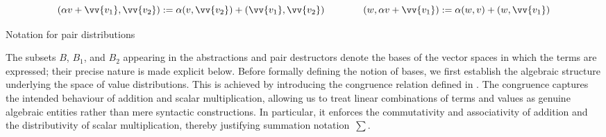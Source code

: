 \documentclass[runningheads,orivec,envcountsame,envcountsect]{llncs}
\def\Pair#1#2{(#1,#2)} %
\begin{document}
\begin{table}[t]
  \[
    \Pair{\alpha  v+\vv{v_1}}{\vv{v_2}} 
    := \alpha\Pair{v}{\vv{v_2}} + \Pair{\vv{v_1}}{\vv{v_2}}
    \qquad\qquad
    \Pair{w}{\alpha  v+\vv{v_1}} 
    := \alpha\Pair{w}{v} + \Pair{w}{\vv{v_1}}
  \]
  \caption{Notation for pair distributions}
  \label{tab:PairsNotation}
\end{table}

The subsets $B$, $B_1$, and $B_2$ appearing in the abstractions and pair
destructors denote the bases of the vector spaces in which the terms are
expressed; their precise nature is made explicit below.
Before formally defining the notion of bases, we first establish the
algebraic structure underlying the space of value distributions.
This is achieved by introducing the congruence relation defined in
.
The congruence captures the intended behaviour of addition and scalar
multiplication, allowing us to treat linear combinations of terms and values
as genuine algebraic entities rather than mere syntactic constructions.
In particular, it enforces the commutativity and associativity of addition and
the distributivity of scalar multiplication, thereby justifying summation
notation~$\sum$.
\end{document}
